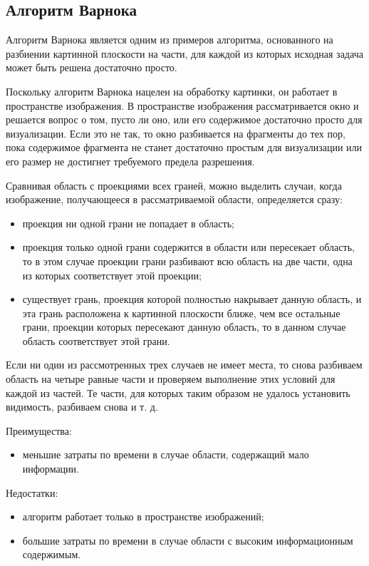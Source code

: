 \subsection{Алгоритм Варнока}

 Алгоритм Варнока является одним из примеров алгоритма, основанного на разбиении картинной плоскости на части, для каждой из которых исходная задача может быть решена достаточно просто.
 
 Поскольку алгоритм Варнока нацелен на обработку картинки, он работает в пространстве изображения. В пространстве изображения рассматривается окно и решается вопрос о том, пусто ли оно, или его содержимое достаточно просто для визуализации. Если это не так, то окно разбивается на фрагменты до тех пор, пока содержимое фрагмента не станет достаточно простым для визуализации или его размер не достигнет требуемого предела разрешения.
 
 Сравнивая область с проекциями всех граней, можно выделить случаи, когда изображение, получающееся в рассматриваемой области, определяется сразу:
 
\begin{itemize}
 \item	проекция ни одной грани не попадает в область;
\item	проекция только одной грани содержится в области или пересекает область, то в этом случае проекции грани разбивают всю область на две части, одна из которых соответствует этой проекции;
\item	существует грань, проекция которой полностью накрывает данную область, и эта грань расположена к картинной плоскости ближе, чем все остальные грани, проекции которых пересекают данную область, то в данном случае область соответствует этой грани.
\end{itemize}
 
 Если ни один из рассмотренных трех случаев не имеет места, то снова разбиваем область на четыре равные части и проверяем выполнение этих условий для каждой из частей. Те части, для которых таким образом не удалось установить видимость, разбиваем снова и т. д.
 
 Преимущества:
 
\begin{itemize}
\item	меньшие затраты по времени в случае области, содержащий мало информации.
\end{itemize}

 Недостатки:
 \begin{itemize}
\item	алгоритм работает только в пространстве изображений;
\item	большие затраты по времени в случае области с высоким информационным содержимым.
\end{itemize}

